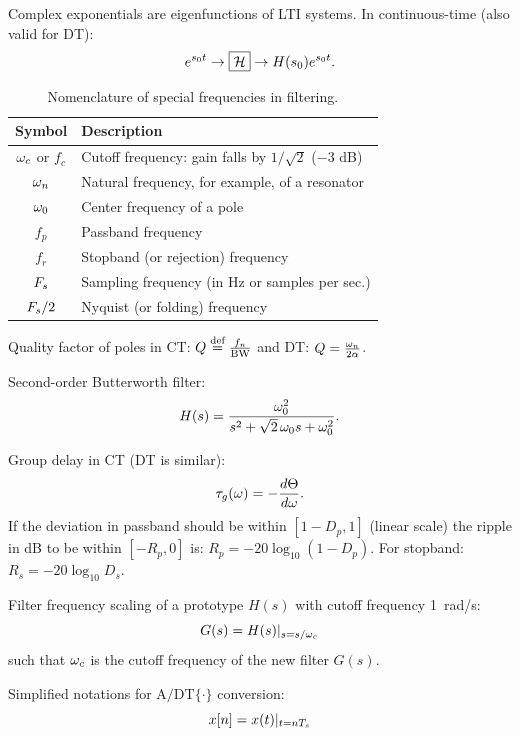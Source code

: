Complex exponentials are eigenfunctions of LTI systems. In continuous-time (also valid for DT):
\[
e^{s_0 t} \rightarrow\boxed{{\cal H}}\rightarrow H(s_0) e^{s_0 t}.
\]
\begin{table}[h]
\centering
\caption{Nomenclature of special frequencies in filtering.\label{tab:special_freqs}}
\begin{tabular}{|c|l|}
\hline 
Symbol & Description  \\
\hline 
${\omega}_c$ or $f_c$ & Cutoff frequency: gain falls by $1/\sqrt{2}$ ($-3$ dB)  \\ \hline
${\omega}_n$ & Natural frequency, for example, of a resonator  \\ \hline
${\omega}_0$ & Center frequency of a pole \\ \hline
$f_p$ & Passband frequency \\ \hline
$f_r$ & Stopband (or rejection) frequency \\ \hline
${F_s}$ & Sampling frequency (in Hz or samples per sec.) \\ \hline 
${F_s}/2$ & Nyquist (or folding) frequency  \\ \hline 
\end{tabular}
\end{table}


Quality factor of poles in CT: $Q \stackrel{\text{def}}{=} \frac{f_n}{ {\textrm{BW}}}$ and
DT: $Q = \frac{{\omega}_n}{2 \alpha}$.

Second-order Butterworth filter:
\[
H(s)=\frac{{\omega}_0^2}
{s^2+\sqrt{2}\,{\omega}_0 s+{\omega}_0^2}.
\]


Group delay in CT (DT is similar):
\begin{equation}
\tau_g({\omega}) = - \frac{d \Theta}{d {\omega}}.
\label{eq:groupDelay}
\end{equation}
If the deviation in passband should be within $[1- D_p, 1]$ (linear scale)
the ripple in dB to be within $[-R_p, 0]$ is:
$
R_p = -20 \log_{10} (1-D_p).
$
For stopband:
$
R_s = -20 \log_{10} D_s.
$


Filter frequency scaling of a prototype $H(s)$ with cutoff frequency 1~rad/s:
\begin{equation}
G(s) = H(s)|_{s=s/{\omega}_c}
\label{eq:frequencyScaling}
\end{equation}
such that ${\omega}_c$ is the cutoff frequency of the new filter $G(s)$.


Simplified notations for $\textrm{A/DT} \{ \cdot \}$ conversion:
\begin{equation}
x[n]=x(t)|_{t=n {T_s}}
\label{eq:a_dt_conversion}
\end{equation}


